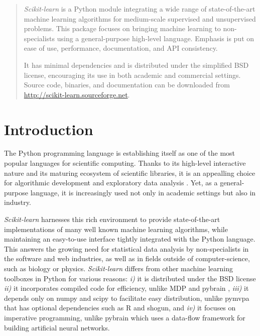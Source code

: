 \documentclass[twoside,11pt]{article}
\begin{document}

\maketitle

\begin{abstract}
%
\emph{Scikit-learn} is a Python module integrating a wide range of
state-of-the-art machine learning algorithms for medium-scale supervised
and unsupervised problems. This package focuses on bringing machine
learning to non-specialists using a general-purpose high-level language.
Emphasis is put on ease of use, performance, documentation, and API
consistency.

%
It has minimal dependencies and is distributed under the simplified BSD
license, encouraging its use in both academic and commercial settings.
Source code, binaries, and documentation can be downloaded from
\url{http://scikit-learn.sourceforge.net}.

\end{abstract}



\section{Introduction}

The Python programming language is establishing itself as one of the
most popular languages for scientific computing. Thanks to its
high-level interactive nature and its maturing ecosystem of scientific
libraries, it is an appealling choice for algorithmic development and
exploratory data analysis \citep{cise2007,cise2011}. Yet, as a
general-purpose language, it is increasingly used not only in academic
settings but also in industry.

{\sl Scikit-learn} harnesses this rich environment to provide state-of-the-art
implementations of
many well known machine learning algorithms, while maintaining an
easy-to-use interface tightly integrated with the Python language. This answers the
growing need for statistical data analysis by non-specialists in the software and web
industries, as well as in fields outside of computer-science, such as biology or physics.
\emph{Scikit-learn} differs from other machine learning toolboxes in Python for
various reasons: \emph{i)} it is distributed under the BSD license
\emph{ii)} it incorporates compiled code for efficiency, unlike MDP
\citep{zito2008} and pybrain \citep{schaul2010}, \emph{iii)} it depends
only on numpy and scipy to facilitate easy distribution, 
unlike pymvpa \citep{hanke2009} that has optional dependencies such
as R and shogun, and \emph{iv)} it focuses on imperative
programming, unlike pybrain which uses a data-flow framework
for building artificial neural networks.
\end{document}
